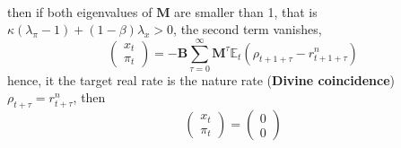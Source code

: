 \documentclass[10pt,landscape,a4paper]{article}
\begin{document}
\begin{multicols*}{3}
\begin{align*}
\end{align*}
then if both eigenvalues of $\mathbf{M}$ are smaller than 1, that is $\kappa(\lambda_{\pi}-1)+(1-\beta)\lambda_x>0$, the second term vanishes,
$$
\begin{pmatrix} 
    x_t\\ \pi_t 
    \end{pmatrix}= -\mathbf{B}\sum^{\infty}_{\tau=0}\mathbf{M}^{\tau}\mathbb{E}_t(\rho_{t+1+\tau}-r^n_{t+1+\tau})
$$
hence, it the target real rate is the nature rate (\textbf{\color{myred}Divine coincidence}) $\rho_{t+\tau}=r^n_{t+\tau}$, then
$$
\begin{pmatrix} 
    x_t\\ \pi_t 
    \end{pmatrix}= \begin{pmatrix} 
    0\\ 0 
    \end{pmatrix}
$$


\end{multicols*}
\end{document}
